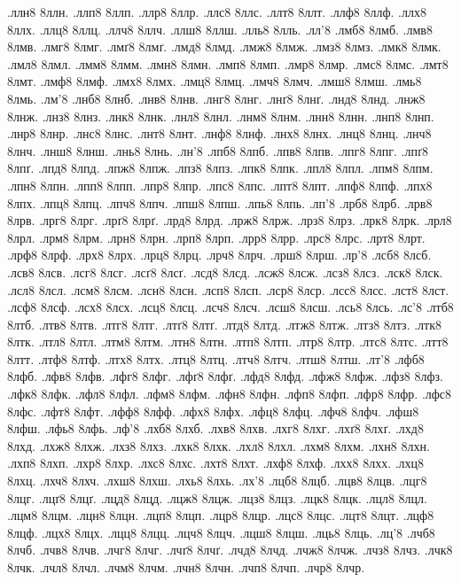 {.ллн8 8ллн.
.ллп8 8ллп.
.ллр8 8ллр.
.ллс8 8ллс.
.ллт8 8ллт.
.ллф8 8ллф.
.ллх8 8ллх.
.ллц8 8ллц.
.ллч8 8ллч.
.ллш8 8ллш.
.лль8 8лль.
.лл'8
.лмб8 8лмб.
.лмв8 8лмв.
.лмг8 8лмг.
.лмґ8 8лмґ.
.лмд8 8лмд.
.лмж8 8лмж.
.лмз8 8лмз.
.лмк8 8лмк.
.лмл8 8лмл.
.лмм8 8лмм.
.лмн8 8лмн.
.лмп8 8лмп.
.лмр8 8лмр.
.лмс8 8лмс.
.лмт8 8лмт.
.лмф8 8лмф.
.лмх8 8лмх.
.лмц8 8лмц.
.лмч8 8лмч.
.лмш8 8лмш.
.лмь8 8лмь.
.лм'8
.лнб8 8лнб.
.лнв8 8лнв.
.лнг8 8лнг.
.лнґ8 8лнґ.
.лнд8 8лнд.
.лнж8 8лнж.
.лнз8 8лнз.
.лнк8 8лнк.
.лнл8 8лнл.
.лнм8 8лнм.
.лнн8 8лнн.
.лнп8 8лнп.
.лнр8 8лнр.
.лнс8 8лнс.
.лнт8 8лнт.
.лнф8 8лнф.
.лнх8 8лнх.
.лнц8 8лнц.
.лнч8 8лнч.
.лнш8 8лнш.
.лнь8 8лнь.
.лн'8
.лпб8 8лпб.
.лпв8 8лпв.
.лпг8 8лпг.
.лпґ8 8лпґ.
.лпд8 8лпд.
.лпж8 8лпж.
.лпз8 8лпз.
.лпк8 8лпк.
.лпл8 8лпл.
.лпм8 8лпм.
.лпн8 8лпн.
.лпп8 8лпп.
.лпр8 8лпр.
.лпс8 8лпс.
.лпт8 8лпт.
.лпф8 8лпф.
.лпх8 8лпх.
.лпц8 8лпц.
.лпч8 8лпч.
.лпш8 8лпш.
.лпь8 8лпь.
.лп'8
.лрб8 8лрб.
.лрв8 8лрв.
.лрг8 8лрг.
.лрґ8 8лрґ.
.лрд8 8лрд.
.лрж8 8лрж.
.лрз8 8лрз.
.лрк8 8лрк.
.лрл8 8лрл.
.лрм8 8лрм.
.лрн8 8лрн.
.лрп8 8лрп.
.лрр8 8лрр.
.лрс8 8лрс.
.лрт8 8лрт.
.лрф8 8лрф.
.лрх8 8лрх.
.лрц8 8лрц.
.лрч8 8лрч.
.лрш8 8лрш.
.лр'8
.лсб8 8лсб.
.лсв8 8лсв.
.лсг8 8лсг.
.лсґ8 8лсґ.
.лсд8 8лсд.
.лсж8 8лсж.
.лсз8 8лсз.
.лск8 8лск.
.лсл8 8лсл.
.лсм8 8лсм.
.лсн8 8лсн.
.лсп8 8лсп.
.лср8 8лср.
.лсс8 8лсс.
.лст8 8лст.
.лсф8 8лсф.
.лсх8 8лсх.
.лсц8 8лсц.
.лсч8 8лсч.
.лсш8 8лсш.
.лсь8 8лсь.
.лс'8
.лтб8 8лтб.
.лтв8 8лтв.
.лтг8 8лтг.
.лтґ8 8лтґ.
.лтд8 8лтд.
.лтж8 8лтж.
.лтз8 8лтз.
.лтк8 8лтк.
.лтл8 8лтл.
.лтм8 8лтм.
.лтн8 8лтн.
.лтп8 8лтп.
.лтр8 8лтр.
.лтс8 8лтс.
.лтт8 8лтт.
.лтф8 8лтф.
.лтх8 8лтх.
.лтц8 8лтц.
.лтч8 8лтч.
.лтш8 8лтш.
.лт'8
.лфб8 8лфб.
.лфв8 8лфв.
.лфг8 8лфг.
.лфґ8 8лфґ.
.лфд8 8лфд.
.лфж8 8лфж.
.лфз8 8лфз.
.лфк8 8лфк.
.лфл8 8лфл.
.лфм8 8лфм.
.лфн8 8лфн.
.лфп8 8лфп.
.лфр8 8лфр.
.лфс8 8лфс.
.лфт8 8лфт.
.лфф8 8лфф.
.лфх8 8лфх.
.лфц8 8лфц.
.лфч8 8лфч.
.лфш8 8лфш.
.лфь8 8лфь.
.лф'8
.лхб8 8лхб.
.лхв8 8лхв.
.лхг8 8лхг.
.лхґ8 8лхґ.
.лхд8 8лхд.
.лхж8 8лхж.
.лхз8 8лхз.
.лхк8 8лхк.
.лхл8 8лхл.
.лхм8 8лхм.
.лхн8 8лхн.
.лхп8 8лхп.
.лхр8 8лхр.
.лхс8 8лхс.
.лхт8 8лхт.
.лхф8 8лхф.
.лхх8 8лхх.
.лхц8 8лхц.
.лхч8 8лхч.
.лхш8 8лхш.
.лхь8 8лхь.
.лх'8
.лцб8 8лцб.
.лцв8 8лцв.
.лцг8 8лцг.
.лцґ8 8лцґ.
.лцд8 8лцд.
.лцж8 8лцж.
.лцз8 8лцз.
.лцк8 8лцк.
.лцл8 8лцл.
.лцм8 8лцм.
.лцн8 8лцн.
.лцп8 8лцп.
.лцр8 8лцр.
.лцс8 8лцс.
.лцт8 8лцт.
.лцф8 8лцф.
.лцх8 8лцх.
.лцц8 8лцц.
.лцч8 8лцч.
.лцш8 8лцш.
.лць8 8лць.
.лц'8
.лчб8 8лчб.
.лчв8 8лчв.
.лчг8 8лчг.
.лчґ8 8лчґ.
.лчд8 8лчд.
.лчж8 8лчж.
.лчз8 8лчз.
.лчк8 8лчк.
.лчл8 8лчл.
.лчм8 8лчм.
.лчн8 8лчн.
.лчп8 8лчп.
.лчр8 8лчр.
}
